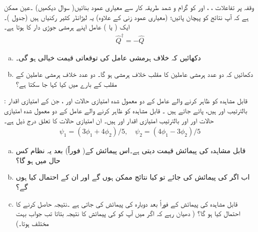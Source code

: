      وقفہ   پر تفاعلات ، ،    اور   کو گرام و  شمد    طریقہ کار  سے معیاری عمود بنائیں( سوال    دیکھیں) ۔عین ممکن ہے کہ آپ نتائج کو پہچان   پائیں؛  (معیاری عمود زنی کے علاوہ) یہ   لیژانڈر کثیر رکنیاں ہیں (جدول  )۔
ایک ( یا   ) عامل   اپنے ہرمشی جوڑی دار کا   ہوتا ہے۔ 
 \begin{align}
 \hat{Q}^{\dagger} = -\hat{Q}
  \end{align}
\begin{enumerate}[a.]
\item
  دکھائیں کہ  خلاف ہرمشی عامل کی   توقعاتی قیمت خیالی ہو گی۔
\item
 دکھائیں کہ دو عدد  ہرمشی عاملین کا مقلب خلاف ہرمشی ہو گا۔ دو عدد  خلاف ہرمشی عاملین کے مقلب کے بارے میں کیا کہا جا سکتا ہے؟ 
\end{enumerate}
: \quad
قابل مشاہدہ  کو ظاہر کرنے والے  عامل   کے دو معمول شدہ امتیازی حالات اور ، جن کے   امتیازی اقدار بالترتیب  اور ہیں،  پائے جاتے ہیں ۔ قابل مشاہدہ   کو ظاہر کرنے والے عامل  کے دو معمول شدہ امتیازی حالات اور  اور بالترتیب امتیازی اقدار اور  ہیں۔ ان امتیازی حالات کا تعلق درج ذیل ہے۔ 
\begin{align*}
\psi_{1} = ( 3\phi_{1} + 4\phi_{2})/5, \quad \psi_{2} = ( 4\phi_{1} - 3\phi_{2})/5
\end{align*}
\begin{enumerate}[a.]
\item 
 قابل مشاہدہ  کی پیمائش  قیمت دیتی ہے۔اس پیمائش کے( فوراً)  بعد یہ نظام کس حال میں ہو گا؟ 
\item
 اب اگر  کی پیمائش کی جائے تو کیا نتائج ممکن ہوں گے اور ان کے احتمال کیا ہوں گے؟ 
\item
 قابل مشاہدہ  کی پیمائش کے فوراً بعد دوبارہ  کی پیمائش کی جاتی ہے ۔نتیجہ  حاصل کرنے کا احتمال کیا ہو گا؟ ( دھیان رہے  کہ اگر میں آپ کو  کی پیمائش کا نتیجہ بتاتا   تب جواب بہت مختلف ہوتا۔) 
\end{enumerate}
